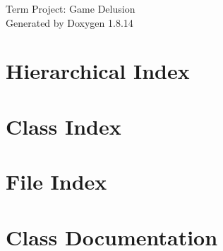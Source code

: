 \documentclass[twoside]{book}
\newcommand{\+}{\discretionary{\mbox{\scriptsize$\hookleftarrow$}}{}{}}
\newcommand{\clearemptydoublepage}{%
  \newpage{\pagestyle{empty}\cleardoublepage}%
}
\begin{document}
\hypersetup{pageanchor=false,
             bookmarksnumbered=true,
             pdfencoding=unicode
            }
\begin{titlepage}
\vspace*{7cm}
\begin{center}%
{\Large Term Project\+: Game Delusion }\\
\vspace*{1cm}
{\large Generated by Doxygen 1.8.14}\\
\end{center}
\end{titlepage}
\clearemptydoublepage
{}
\tableofcontents
\clearemptydoublepage
{}
\hypersetup{pageanchor=true}

\chapter{Hierarchical Index}

\chapter{Class Index}

\chapter{File Index}

\chapter{Class Documentation}






































\end{document}
